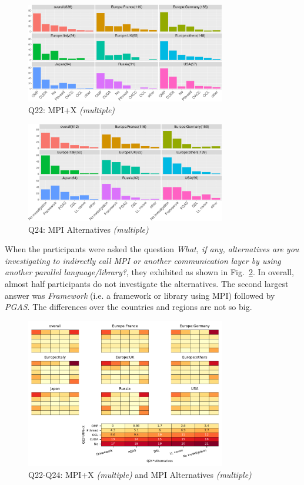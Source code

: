\documentclass[preprint,5p,times]{elsarticle}
\def\myquote#1{{\it #1}}
\begin{document}
\begin{figure}[htb]
\begin{center}
\includegraphics[width=8.7cm]{R-scripts/Q22.pdf}
\caption{Q22: MPI+X {\it(multiple)}}
\label{fig:mpi-x}
\end{center}
\end{figure}

\begin{figure}[htb]
\begin{center}
\includegraphics[width=8.7cm]{R-scripts/Q24.pdf}
\caption{Q24: MPI Alternatives {\it(multiple)}}
\label{fig:mpi-alternatives}
\end{center}
\end{figure}

When the participants were asked the question \myquote{What, if any,
alternatives are you investigating to indirectly call MPI or another
communication layer by using another parallel language/library?}, they
exhibited as shown in Fig.~\ref{fig:mpi-alternatives}. In overall,
almost half participants do not investigate the alternatives. The second
largest answer was \myquote{Framework} (i.e. a framework or library
using MPI) followed by \myquote{PGAS}. The
differences over the countries and regions are not so big.

\begin{figure}[htb]
\begin{center}
\includegraphics[width=8.7cm]{Figs/Q22-Q24.pdf}
\caption{Q22-Q24: MPI+X {\it(multiple)} and MPI Alternatives {\it(multiple)}}
\label{fig:mpi-x-and-alternatives}
\end{center}
\end{figure}
\end{document}
